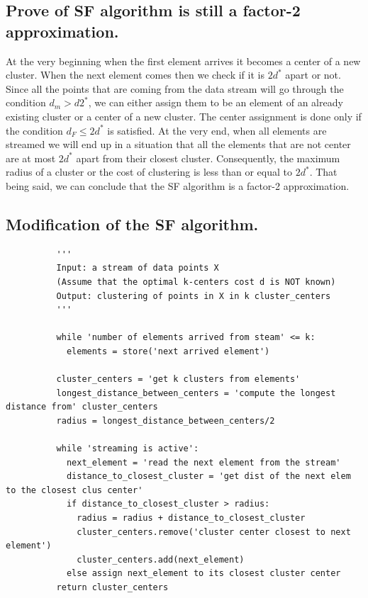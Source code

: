 \documentclass[11pt,a4paper,english]{article}
\begin{document}
      \subsection{Prove of SF algorithm is still a factor-2 approximation.}
        At the very beginning when the first element arrives it becomes a center of a new cluster. When the next element comes then we check if it is $2d^*$ apart or not. Since all the points that are coming from the data stream will go through the condition $d_m > d2^*$, we can either assign them to be an element of an already existing cluster or a center of a new cluster. The center assignment is done only if the condition $d_F \leq 2d^*$ is satisfied. At the very end, when all elements are streamed we will end up in a situation that all the elements that are not center are at most $2d^*$ apart from their closest cluster. Consequently, the maximum radius of a cluster or the cost of clustering is less than or equal to $2d^*$. That being said, we can conclude that the SF algorithm is a factor-2 approximation.
      \subsection{Modification of the SF algorithm.}
        \begin{verbatim}
          '''
          Input: a stream of data points X
          (Assume that the optimal k-centers cost d is NOT known)
          Output: clustering of points in X in k cluster_centers
          '''

          while 'number of elements arrived from steam' <= k:
            elements = store('next arrived element')

          cluster_centers = 'get k clusters from elements'
          longest_distance_between_centers = 'compute the longest distance from' cluster_centers
          radius = longest_distance_between_centers/2

          while 'streaming is active':
            next_element = 'read the next element from the stream'
            distance_to_closest_cluster = 'get dist of the next elem to the closest clus center'
            if distance_to_closest_cluster > radius:
              radius = radius + distance_to_closest_cluster
              cluster_centers.remove('cluster center closest to next element')
              cluster_centers.add(next_element)
            else assign next_element to its closest cluster center
          return cluster_centers
        \end{verbatim}
\end{document}
